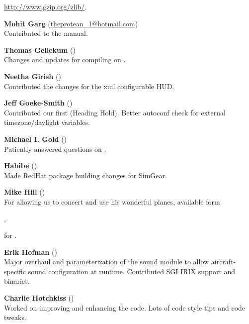   \href{http://www.gzip.org/zlib/}{http://www.gzip.org/zlib/}.
 \medskip

\noindent \textbf{Mohit Garg}
(\href{mailto:theprotean_1@hotmail.com}{theprotean\_1@hotmail.com})\\
 Contributed to the manual.
 \medskip

\noindent \textbf{Thomas Gellekum}
()\\
  Changes and updates for compiling on .
 \medskip

\noindent \textbf{Neetha Girish}
()\\
  Contributed the changes for the xml configurable HUD.
 \medskip

\noindent \textbf{Jeff Goeke-Smith}
()\\
  Contributed our first  (Heading Hold).
  Better autoconf check for external timezone/daylight variables.
 \medskip

\noindent \textbf{Michael I. Gold}
()\\
 Patiently answered questions on .
 \medskip

\noindent \textbf{Habibe} ()\\
 Made RedHat package building changes for SimGear.
 \medskip

\noindent \textbf{Mike Hill} ()\\
 For allowing us to concert and use his wonderful planes, available form
 \medskip

 ,

 \noindent
 for \FlightGear{}.
 \medskip

\noindent \textbf{Erik Hofman} ()\\
  Major overhaul and parameterization of the sound module to allow
  aircraft-specific sound configuration at runtime.
  Contributed SGI IRIX support and binaries.
 \medskip

\noindent \textbf{Charlie Hotchkiss}
()\\ Worked on improving and enhancing the  code.
Lots of code style tips and code tweaks.
 \medskip

